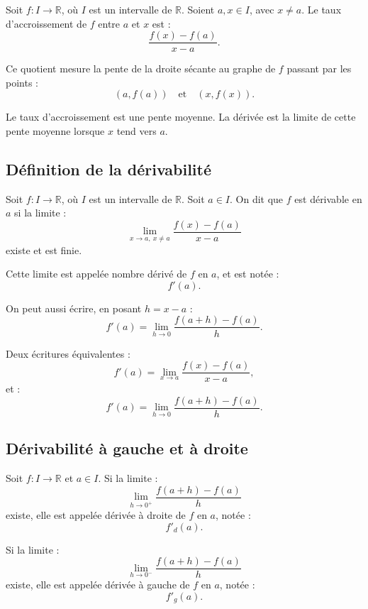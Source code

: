 \documentclass[11pt,a4paper]{article}
\newcommand{\R}{\mathbb R}
\begin{document}
\begin{definitionbox}
Soit \(f:I\to\R\), où \(I\) est un intervalle de \(\R\).  
Soient \(a,x\in I\), avec \(x\neq a\).  
Le taux d'accroissement de \(f\) entre \(a\) et \(x\) est :
\[
\frac{f(x)-f(a)}{x-a}.
\]
\end{definitionbox}

Ce quotient mesure la pente de la droite sécante au graphe de \(f\) passant par les points :
\[
(a,f(a))
\quad\text{et}\quad
(x,f(x)).
\]

\begin{retenirbox}
Le taux d'accroissement est une pente moyenne.  
La dérivée est la limite de cette pente moyenne lorsque \(x\) tend vers \(a\).
\end{retenirbox}

\subsection{Définition de la dérivabilité}

\begin{definitionbox}
Soit \(f:I\to\R\), où \(I\) est un intervalle de \(\R\).  
Soit \(a\in I\).  
On dit que \(f\) est dérivable en \(a\) si la limite :
\[
\lim_{x\to a,\ x\neq a}\frac{f(x)-f(a)}{x-a}
\]
existe et est finie.

Cette limite est appelée nombre dérivé de \(f\) en \(a\), et est notée :
\[
f'(a).
\]
\end{definitionbox}

On peut aussi écrire, en posant \(h=x-a\) :
\[
f'(a)=\lim_{h\to0}\frac{f(a+h)-f(a)}{h}.
\]

\begin{retenirbox}
Deux écritures équivalentes :
\[
f'(a)=\lim_{x\to a}\frac{f(x)-f(a)}{x-a},
\]
et :
\[
f'(a)=\lim_{h\to0}\frac{f(a+h)-f(a)}{h}.
\]
\end{retenirbox}

\subsection{Dérivabilité à gauche et à droite}

\begin{definitionbox}
Soit \(f:I\to\R\) et \(a\in I\).  
Si la limite :
\[
\lim_{h\to0^+}\frac{f(a+h)-f(a)}{h}
\]
existe, elle est appelée dérivée à droite de \(f\) en \(a\), notée :
\[
f'_d(a).
\]

Si la limite :
\[
\lim_{h\to0^-}\frac{f(a+h)-f(a)}{h}
\]
existe, elle est appelée dérivée à gauche de \(f\) en \(a\), notée :
\[
f'_g(a).
\]
\end{definitionbox}
\end{document}
